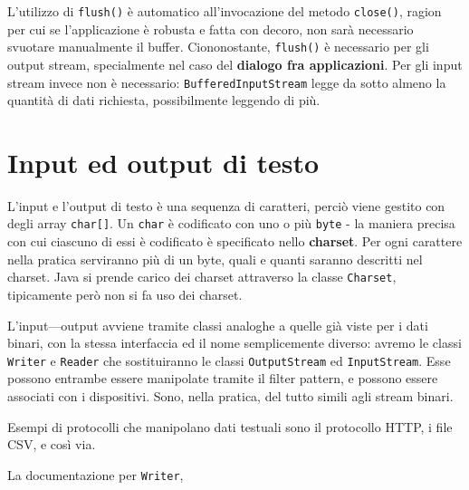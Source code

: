 \documentclass[\fontsizeclass,twocolumn]{\classname}
\theoremstyle{definition}
\theoremstyle{definition}
\begin{document}
L'utilizzo di \texttt{flush()} è automatico all'invocazione del metodo
\texttt{close()}, ragion per cui se l'applicazione è robusta e fatta con
decoro, non sarà necessario svuotare manualmente il buffer. Ciononostante,
\texttt{flush()} è necessario per gli output stream, specialmente nel caso del
\textbf{dialogo fra applicazioni}. Per gli input stream invece non è
necessario: \texttt{BufferedInputStream} legge da sotto almeno la quantità di
dati richiesta, possibilmente leggendo di più.

\chapter{Input ed output di testo}

L'input e l'output di testo è una sequenza di caratteri, perciò viene gestito
con degli array \texttt{char[]}. Un \texttt{char} è codificato con uno o più
\texttt{byte} \-- la maniera precisa con cui ciascuno di essi è codificato è
specificato nello \textbf{charset}. Per ogni carattere nella pratica serviranno
più di un byte, quali e quanti saranno descritti nel charset. Java si prende
carico dei charset attraverso la classe \texttt{Charset}, tipicamente però non
si fa uso dei charset.

L'input\----output avviene tramite classi analoghe a quelle già viste per i
dati binari, con la stessa interfaccia ed il nome semplicemente diverso:
avremo le classi \texttt{Writer} e \texttt{Reader} che sostituiranno le classi
\texttt{Output\-Stream} ed \texttt{Input\-Stream}. Esse possono entrambe essere
manipolate tramite il filter pattern, e possono essere associati con i
dispositivi. Sono, nella pratica, del tutto simili agli stream binari.

Esempi di protocolli che manipolano dati testuali sono il protocollo HTTP, i
file CSV, e così via.

La documentazione per \texttt{Writer},
\end{document}
